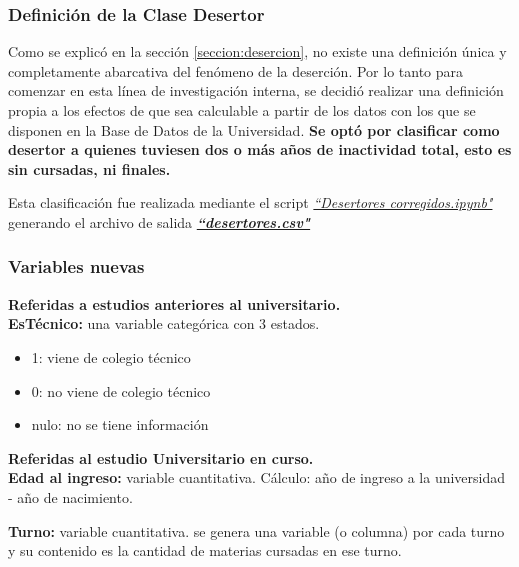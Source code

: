 \subsubsection{Definición de la Clase Desertor}\label{definicion_clase_desertor}

Como se explicó en la sección \ref{seccion:desercion}, no existe una definición única y completamente abarcativa del fenómeno de la deserción. 
Por lo tanto para comenzar en esta línea de investigación interna, se decidió realizar una definición propia a los efectos de que sea calculable a partir de los datos con los que se disponen en la  Base de Datos de la Universidad. \textbf{Se optó por clasificar como desertor a quienes tuviesen dos o más años de inactividad total, esto es sin cursadas, ni finales.}

Esta clasificación fue realizada mediante el script \underline{\textit{``Desertores corregidos.ipynb"}} generando el archivo de salida \underline{\textit{\textbf{``desertores.csv"}}}



\subsubsection{Variables nuevas}

\textbf{Referidas a estudios anteriores al universitario.} \\
\textbf{EsTécnico:} una variable categórica con 3 estados.
\begin{itemize}
\item 1: viene de colegio técnico
\item 0: no viene de colegio técnico
\item nulo: no se tiene información
\end{itemize}

\vspace{3mm}

\textbf{Referidas al estudio Universitario en curso.} \\
\textbf{Edad al ingreso:} variable cuantitativa. Cálculo: año de ingreso a la universidad - año de nacimiento.

\vspace{3mm}

\textbf{Turno:} variable cuantitativa. se genera una variable (o columna) por cada turno y su contenido es la cantidad de materias cursadas en ese turno.

